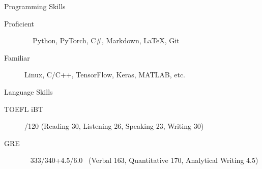 \documentclass{resume} %
\begin{document}
\begin{rSection}{Programming Skills}

\begin{description}
    \item[Proficient] \quad\quad\quad\quad\,\,\,\,\, Python, PyTorch, C\#, Markdown, \LaTeX, Git
    \item[Familiar] \quad\quad\quad\quad\quad\quad Linux, C/C++, TensorFlow, Keras, MATLAB, etc.
    \newline
\end{description}

\end{rSection}

\begin{rSection}{Language Skills}

\begin{description}
    \item[TOEFL iBT] /120 \quad (Reading 30, Listening 26, Speaking 23, Writing 30)
    \item[GRE] \quad\quad\quad\quad\,\,\, 333/340+4.5/6.0 \, (Verbal 163, Quantitative 170, Analytical Writing 4.5)
\end{description}

\end{rSection}
\end{document}
